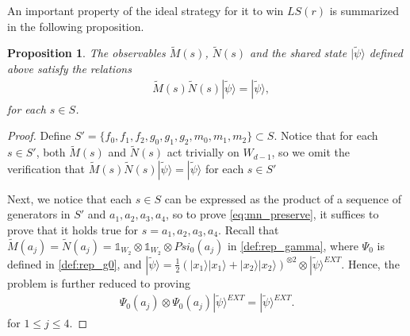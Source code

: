 \documentclass[11pt,letterpaper]{article}
\newcommand{\ket}[1]{|#1\rangle}
\newcommand{\x}{\otimes}
\newcommand{\1}{\mathbb{1}}
\newcommand{\EXT}{EXT}
\newcommand{\LS}{LS}
\newcommand{\tM}{\tilde{M}}
\newcommand{\tN}{\tilde{N}}
\newcommand{\tpsi}{\tilde{\psi}}
\newtheorem{proposition}[theorem]{Proposition}
\theoremstyle{definition}
\begin{document}
An important property of the ideal strategy for it to win $\LS(r)$ is summarized in the 
following proposition.
\begin{proposition}
The observables $\tM(s)$, $\tN(s)$
and the shared state $\ket{\tpsi}$ defined above
satisfy the relations
\begin{align}
	\label{eq:mn_preserve} &\tM(s) \tN(s) \ket{\tpsi} = \ket{\tpsi},
\end{align}
for each $s \in S$.
\end{proposition}
\begin{proof}
    Define $S' = \{f_0, f_1, f_2, g_0, g_1, g_2, m_0, m_1, m_2\} \subset S$. Notice that for each $s \in S'$, both $\tM(s)$ and $\tN(s)$ act
    trivially on $W_{d-1}$, so we omit the verification that 
    $\tM(s)\tN(s) \ket{\tpsi} = \ket{\tpsi}$ for each $s \in S'$
	
	Next, we notice that each $s \in S$ can be expressed as the 
	product of a sequence of generators in $S'$ and $a_1, a_2, a_3, a_4$, so
	to prove \cref{eq:mn_preserve}, it suffices to prove that it 
	holds true for $s = a_1, a_2, a_3, a_4$. 
	Recall that $\tM(a_j) = \tN(a_j) = \1_{W_2} \x \1_{W_2} \x Psi_0(a_j)$
	in \cref{def:rep_gamma},
	where $\Psi_0$ is defined in \cref{def:rep_g0},
	and $\ket{\tpsi} = \frac{1}{2} (\ket{x_1}\ket{x_1}+\ket{x_2}\ket{x_2})^{\x 2} \x \ket{\tpsi}^{\EXT}$.
	Hence, the problem is further reduced to proving
	\begin{align*}
	    \Psi_0(a_j) \x \Psi_0(a_j) \ket{\tpsi}^{\EXT} = \ket{\tpsi}^{\EXT}.
	\end{align*}
	for $1 \leq j \leq 4$.
	

\end{proof}
\end{document}
